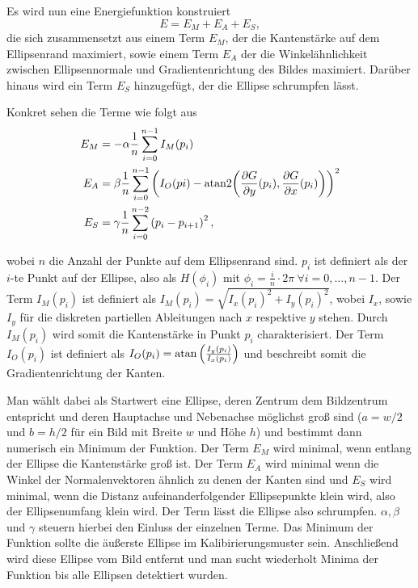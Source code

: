 Es wird nun eine Energiefunktion konstruiert
\[
	E = E_M + E_A + E_S,
\]
die sich zusammensetzt aus einem Term $E_M$, der die Kantenstärke auf dem Ellipsenrand maximiert, sowie einem Term $E_A$ der die Winkelähnlichkeit zwischen Ellipsennormale und Gradientenrichtung des Bildes maximiert. Darüber hinaus wird ein Term $E_S$ hinzugefügt, der die Ellipse schrumpfen lässt.

Konkret sehen die Terme wie folgt aus
\begin{equation}\label{eq:deformTerms}
	\begin{aligned}
		E_M &= -\alpha\frac{1}{n}\sum_{i=0}^{n-1}I_M(p_i) \\
		E_A &= \beta\frac{1}{n}\sum_{i=0}^{n-1}\left(I_O(pi) - \text{atan2}{\left(\frac{\partial G}{\partial y}(p_i), \frac{\partial G}{\partial x}(p_i)\right)}\right)^2 \\
		E_S &= \gamma\frac{1}{n}\sum_{i=0}^{n-2}\left(p_i - p_{i+1}\right)^2,
	\end{aligned}
\end{equation}

wobei $n$ die Anzahl der Punkte auf dem Ellipsenrand sind. $p_i$ ist definiert als der $i$-te Punkt auf der Ellipse, also als $H(\phi_i)$ mit $\phi_i = \frac{i}{n}\cdot2\pi ~\forall i = 0,\dotsc,n-1$.
Der Term $I_M(p_i)$ ist definiert als $I_M(p_i) = \sqrt{I_x(p_i)^2 + I_y(p_i)^2}$, wobei $I_x$, sowie $I_y$ für die diskreten partiellen Ableitungen nach $x$ respektive $y$ stehen. Durch $I_M(p_i)$ wird somit die Kantenstärke in Punkt $p_i$ charakterisiert. Der Term $I_O(p_i)$ ist definiert als $I_O(p_i) = \text{atan}\left(\frac{I_y(p_i)}{I_x(p_i)}\right)$
und beschreibt somit die Gradientenrichtung der Kanten.

Man wählt dabei als Startwert eine Ellipse, deren Zentrum dem Bildzentrum entspricht und deren Hauptachse und Nebenachse möglichst groß sind ($a = w/2$ und $b = h/2$ für ein Bild mit Breite $w$ und Höhe $h$) und bestimmt dann numerisch ein Minimum der Funktion. Der Term $E_M$ wird minimal, wenn entlang der Ellipse die Kantenstärke groß ist. Der Term $E_A$ wird minimal wenn die Winkel der Normalenvektoren ähnlich zu denen der Kanten sind und $E_S$ wird minimal, wenn die Distanz aufeinanderfolgender Ellipsepunkte klein wird, also der Ellipsenumfang klein wird. Der Term lässt die Ellipse also schrumpfen. $\alpha, \beta$ und $\gamma$ steuern hierbei den Einluss der einzelnen Terme. Das Minimum der Funktion sollte die äußerste Ellipse im Kalibirierungsmuster sein. Anschließend wird diese Ellipse vom Bild entfernt und man sucht wiederholt Minima der Funktion bis alle Ellipsen detektiert wurden.




